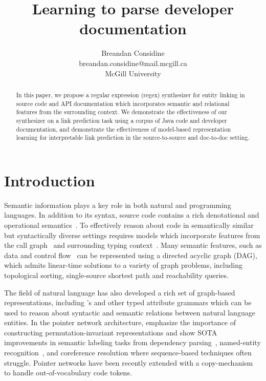 \documentclass{article}
\title{Learning to parse developer documentation}
\author{Breandan Considine\\
breandan.considine@mail.mcgill.ca\\
McGill University}
\begin{document}
\maketitle

\begin{abstract}
In this paper, we propose a regular expression (regex) synthesizer for entity linking in source code and API documentation which incorporates semantic and relational features from the surrounding context. We demonstrate the effectiveness of our synthesizer on a link prediction task using a corpus of Java code and developer documentation, and demonstrate the effectiveness of model-based representation learning for interpretable link prediction in the source-to-source and doc-to-doc setting.
\end{abstract}

\section{Introduction}

Semantic information plays a key role in both natural and programming languages. In addition to its syntax, source code contains a rich denotational and operational semantics~\citep{henkel2018code}. To effectively reason about code in semantically similar but syntactically diverse settings requires models which incorporate features from the call graph~\citep{gu2016deep, gu2018deep, liu2019neural} and surrounding typing context~\citep{allamanis2017learning}. Many semantic features, such as data and control flow~\citep{si2018learning} can be represented using a directed acyclic graph (DAG), which admits linear-time solutions to a variety of graph problems, including topological sorting, single-source shortest path and reachability queries.

The field of natural language has also developed a rich set of graph-based representations, including \citet{reddy2016transforming}'s and other typed attribute grammars which can be used to reason about syntactic and semantic relations between natural language entities. In the pointer network architecture, \citet{vinyals2015pointer, vinyals2015order} emphasize the importance of constructing  permutation-invariant representations and show SOTA improvements in semantic labeling tasks from dependency parsing~\citep{ma2018stack}, named-entity recognition~\citep{lample2016neural}, and coreference resolution where sequence-based techniques often struggle. Pointer networks have been recently extended with a copy-mechanism~\citep{li2017code} to handle out-of-vocabulary code tokens.
\end{document}
